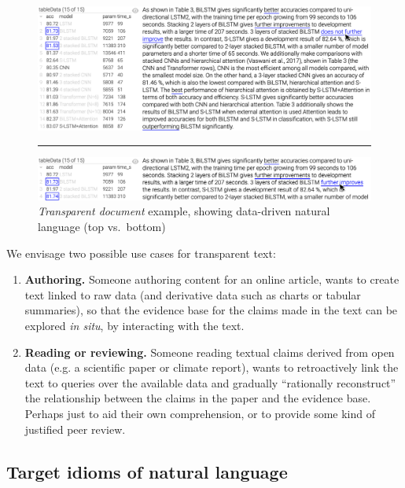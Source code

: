 \begin{figure}%
    \centering
    \includegraphics[width=\linewidth]{fig/scigen-1805.02474v1-10-with-pointer.png}
    \vspace{1mm}
    \hrule
    \includegraphics[width=\linewidth]{fig/scigen-1805.02474v1-10-counterfactual-with-pointer.png}
    \caption{\emph{Transparent document} example, showing data-driven natural language (top
    vs.~bottom)}\label{fig:scigen-example-website}
\end{figure}

We envisage two possible use cases for transparent text:

\begin{enumerate}
\item \textbf{Authoring.} Someone authoring content for an online article, wants to create text
linked to raw data (and derivative data such as charts or tabular summaries), so that the evidence base for
the claims made in the text can be explored \emph{in situ}, by interacting with the text.

\item \textbf{Reading or reviewing.} Someone reading textual claims derived from open data (e.g. a
scientific paper or climate report), wants to retroactively link the text to queries over the available data
and gradually ``rationally reconstruct'' the relationship between the claims in the paper and the evidence
base. Perhaps just to aid their own comprehension, or to provide some kind of justified peer review.
\end{enumerate}



\subsection{Target idioms of natural language}

